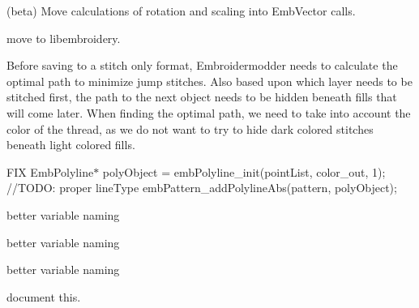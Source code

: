 \begin{DoxyRefList}
\label{todo__todo000163}%
%
(beta) Move calculations of rotation and scaling into {\ttfamily Emb\+Vector} calls. 
\item[Member \mbox{\hyperlink{utility_8cpp_abf62628119dde9fd93f65be6742e2b22}{random\+\_\+uniform}} (void)]\label{todo__todo000013}%
%
move to libembroidery. 
\item[Member \mbox{\hyperlink{class_save_object_a15bdf578a20c1c1cb630dc8264448484}{Save\+Object\+::save}} (const QString \&file\+Name)]\label{todo__todo000010}%
%
Before saving to a stitch only format, Embroidermodder needs to calculate the optimal path to minimize jump stitches. Also based upon which layer needs to be stitched first, the path to the next object needs to be hidden beneath fills that will come later. When finding the optimal path, we need to take into account the color of the thread, as we do not want to try to hide dark colored stitches beneath light colored fills.  
\item[Member \mbox{\hyperlink{class_save_object_aaa28ee2579ab1b54602812d652889737}{Save\+Object\+::to\+Polyline}} (Emb\+Pattern $\ast$pattern, const QPointF \&obj\+Pos, const QPainter\+Path \&obj\+Path, const QString \&layer, const QColor \&color, const QString \&line\+Type, const QString \&line\+Weight)]\label{todo__todo000011}%
%
FIX Emb\+Polyline$\ast$ poly\+Object = emb\+Polyline\+\_\+init(point\+List, color\+\_\+out, 1); //\+TODO\+: proper line\+Type emb\+Pattern\+\_\+add\+Polyline\+Abs(pattern, poly\+Object);  
\item[Member \mbox{\hyperlink{struct_sub_descriptor___affb2c75b7f632338f368aafab49f678d}{Sub\+Descriptor\+\_\+\+::color\+Code}} ]\label{todo__todo000187}%
%
better variable naming  
\item[Member \mbox{\hyperlink{struct_sub_descriptor___a0cfe04519ff6dab092ee7c002e55e520}{Sub\+Descriptor\+\_\+\+::some\+Int}} ]\label{todo__todo000185}%
%
better variable naming  
\item[Member \mbox{\hyperlink{struct_sub_descriptor___a6154b0f4ec7815c6d26c71852506418e}{Sub\+Descriptor\+\_\+\+::some\+Other\+Int}} ]\label{todo__todo000186}%
%
better variable naming  
\item[Member \mbox{\hyperlink{embroidermodder_8h_a459ace9a6c614fe41b7f08ba91bc6dd4}{Undo\+History}} ]\label{todo__todo000001}%
%
document this. 
\end{DoxyRefList}